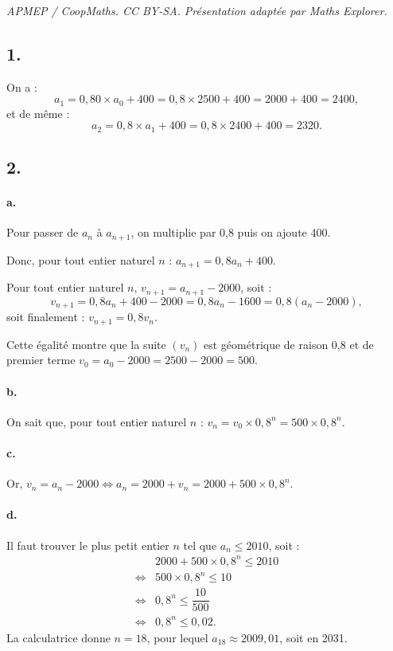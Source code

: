 \documentclass[10pt]{article}
\begin{document}
\noindent\textit{APMEP / CoopMaths. CC BY-SA. Présentation adaptée par Maths Explorer.}\par\medskip
\subsection*{1.}

On a :
\[
a_1 = 0{,}80 \times a_0 + 400 = 0{,}8 \times 2500 + 400 = 2000 + 400 = 2400,
\]
et de même :
\[
a_2 = 0{,}8 \times a_1 + 400 = 0{,}8 \times 2400 + 400 = 2320.
\]

\subsection*{2.}

\paragraph{a.} Pour passer de \(a_n\) à \(a_{n+1}\), on multiplie par 0{,}8 puis on ajoute 400.  

Donc, pour tout entier naturel \(n\) : \(a_{n+1} = 0{,}8 a_n + 400\).

Pour tout entier naturel \(n\), \(v_{n+1} = a_{n+1} - 2000\), soit :
\[
v_{n+1} = 0{,}8 a_n + 400 - 2000 = 0{,}8 a_n - 1600 = 0{,}8(a_n - 2000),
\]
soit finalement : \( v_{n+1} = 0{,}8 v_n.\)

Cette égalité montre que la suite \((v_n)\) est géométrique de raison 0{,}8 et de premier terme \(v_0 = a_0 - 2000 = 2500 - 2000 = 500\).

\paragraph{b.} On sait que, pour tout entier naturel \(n\) : \(v_n = v_0 \times 0{,}8^n = 500 \times 0{,}8^n\).

\paragraph{c.} Or, \(v_n = a_n - 2000 \iff a_n = 2000 + v_n = 2000 + 500 \times 0{,}8^n\).

\paragraph{d.} Il faut trouver le plus petit entier \(n\) tel que \(a_n \leqslant 2010\), soit :
\begin{align*}
&2000 + 500 \times 0{,}8^n \leqslant 2010 \\
\iff &500 \times 0{,}8^n \leqslant 10 \\
\iff &0{,}8^n \leqslant \dfrac{10}{500} \\
\iff &0{,}8^n \leqslant 0{,}02.
\end{align*}
La calculatrice donne \(n = 18\), pour lequel \(a_{18} \approx 2009{,}01\), soit en 2031.
\end{document}
